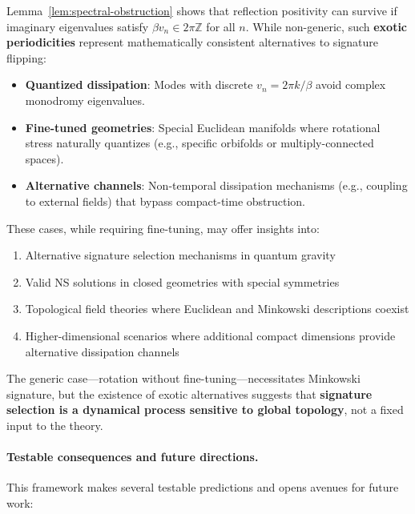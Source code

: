 \documentclass[11pt]{article}
\begin{document}
Lemma~\ref{lem:spectral-obstruction} shows that reflection positivity can survive 
if imaginary eigenvalues satisfy $\beta v_n \in 2\pi\mathbb{Z}$ for all $n$. While 
non-generic, such \textbf{exotic periodicities} represent mathematically consistent 
alternatives to signature flipping:

\begin{itemize}
\item \textbf{Quantized dissipation}: Modes with discrete $v_n = 2\pi k/\beta$ avoid 
complex monodromy eigenvalues.

\item \textbf{Fine-tuned geometries}: Special Euclidean manifolds where rotational 
stress naturally quantizes (e.g., specific orbifolds or multiply-connected spaces).

\item \textbf{Alternative channels}: Non-temporal dissipation mechanisms (e.g., 
coupling to external fields) that bypass compact-time obstruction.
\end{itemize}

These cases, while requiring fine-tuning, may offer insights into:
\begin{enumerate}
\item Alternative signature selection mechanisms in quantum gravity
\item Valid NS solutions in closed geometries with special symmetries  
\item Topological field theories where Euclidean and Minkowski descriptions coexist
\item Higher-dimensional scenarios where additional compact dimensions provide 
alternative dissipation channels
\end{enumerate}

The generic case---rotation without fine-tuning---necessitates Minkowski signature, 
but the existence of exotic alternatives suggests that \textbf{signature selection 
is a dynamical process sensitive to global topology}, not a fixed input to the theory.

\paragraph{Testable consequences and future directions.}
This framework makes several testable predictions and opens avenues for future work:
\end{document}
